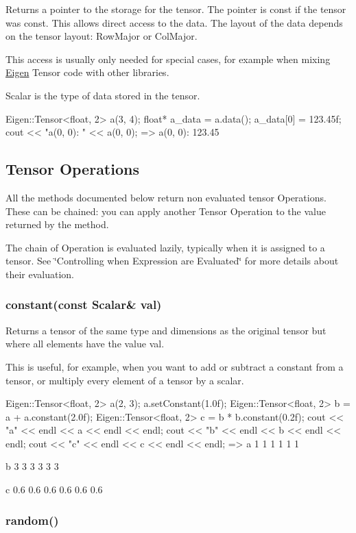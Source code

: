 Returns a pointer to the storage for the tensor. The pointer is const if the tensor was const. This allows direct access to the data. The layout of the data depends on the tensor layout\+: Row\+Major or Col\+Major.

This access is usually only needed for special cases, for example when mixing \hyperlink{namespace_eigen}{Eigen} Tensor code with other libraries.

Scalar is the type of data stored in the tensor. \begin{DoxyVerb}Eigen::Tensor<float, 2> a(3, 4);
float* a_data = a.data();
a_data[0] = 123.45f;
cout << "a(0, 0): " << a(0, 0);
=> a(0, 0): 123.45
\end{DoxyVerb}


\subsection*{Tensor Operations}

All the methods documented below return non evaluated tensor {\ttfamily Operations}. These can be chained\+: you can apply another Tensor Operation to the value returned by the method.

The chain of Operation is evaluated lazily, typically when it is assigned to a tensor. See \char`\"{}\+Controlling when Expression are Evaluated\char`\"{} for more details about their evaluation.

\subsubsection*{constant(const Scalar\& val)}

Returns a tensor of the same type and dimensions as the original tensor but where all elements have the value {\ttfamily val}.

This is useful, for example, when you want to add or subtract a constant from a tensor, or multiply every element of a tensor by a scalar. \begin{DoxyVerb}Eigen::Tensor<float, 2> a(2, 3);
a.setConstant(1.0f);
Eigen::Tensor<float, 2> b = a + a.constant(2.0f);
Eigen::Tensor<float, 2> c = b * b.constant(0.2f);
cout << "a" << endl << a << endl << endl;
cout << "b" << endl << b << endl << endl;
cout << "c" << endl << c << endl << endl;
=>
a
1 1 1
1 1 1

b
3 3 3
3 3 3

c
0.6 0.6 0.6
0.6 0.6 0.6
\end{DoxyVerb}


\subsubsection*{random()}

